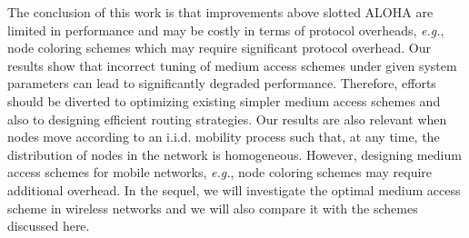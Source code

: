 \documentclass[12pt,english]{article}
\begin{document}
The conclusion of this work is that improvements above slotted ALOHA are limited in performance and may be costly in terms of protocol overheads, {\it e.g.}, node coloring schemes which may require significant protocol overhead. Our results show that incorrect tuning of medium access schemes under given system parameters can lead to significantly degraded performance. Therefore, efforts should be diverted to optimizing existing simpler medium access schemes and also to designing efficient routing strategies. Our results are also relevant when nodes move according to an i.i.d. mobility process such that, at any time, the distribution of nodes in the network is homogeneous. However, designing medium access schemes for mobile networks, {\it e.g.}, node coloring schemes may require additional overhead. In the sequel, we will investigate the optimal medium access scheme in wireless networks and we will also compare it with the schemes discussed here.  



\end{document}
